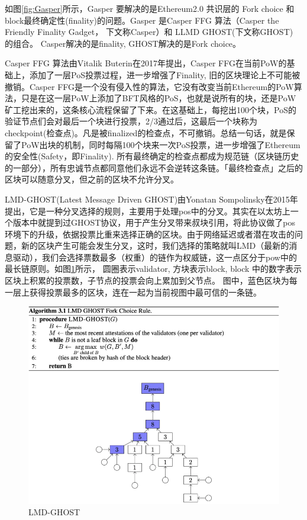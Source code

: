 \documentclass[a4paper,twoside]{scrbook}
\begin{document}
\begin{CJK}{UTF8}{gbsn}
如图\ref{fig:Gasper}所示，Gasper 要解决的是Ethereum2.0 共识层的 Fork choice 和 block最终确定性(finality)的问题。Gasper 是Casper FFG 算法（Casper the Friendly Finality Gadget， 下文称Casper）和 LLMD GHOST(下文称GHOST) 的组合。 Casper解决的是finality, GHOST解决的是Fork choice。

Casper FFG 算法由Vitalik Buterin\cite{buterin2017casper}在2017年提出，Casper FFG在当前PoW的基础上，添加了一层PoS投票过程，进一步增强了Finality, 旧的区块理论上不可能被撤销。Casper FFG是一个没有侵入性的算法，它没有改变当前Ethereum的PoW算法，只是在这一层PoW上添加了BFT风格的PoS，也就是说所有的块，还是PoW矿工挖出来的，这条核心流程保留了下来。在这基础上，每挖出100个块，PoS的验证节点们会对最后一个块进行投票，2/3通过后，这最后一个块称为checkpoint(检查点)。凡是被finalized的检查点，不可撤销。总结一句话，就是保留了PoW出块的机制，同时每隔100个块来一次PoS投票，进一步增强了Ethereum的安全性(Safety，即Finality). 所有最终确定的检查点都成为规范链（区块链历史的一部分），所有忠诚节点都同意他们永远不会逆转这条链。「最终检查点」之后的区块可以随意分叉，但之前的区块不允许分叉。

LMD-GHOST(Latest Message Driven GHOST)由Yonatan Sompolinsky\cite{sompolinsky2015secure}在2015年提出，它是一种分叉选择的规则，主要用于处理pos中的分叉。其实在以太坊上一个版本中就提到过GHOST协议，用于产生分叉带来叔块引用，将此协议做了pos环境下的升级，依据投票比重来选择正确的区块。由于网络延迟或者潜在攻击的问题，新的区块产生可能会发生分叉，这时，我们选择的策略就叫LMD（最新的消息驱动），我们会选择票数最多（权重）的链作为权威链，这一点区分于pow中的最长链原则。如图\ref{fig:GHOST}所示， 圆圈表示validator, 方块表示block, block 中的数字表示区块上积累的投票数，子节点的投票会向上累加到父节点。 图中，蓝色区块为每一层上获得投票最多的区块，连在一起为当前视图中最可信的一条链。

\begin{figure}[!htbp]
\centering
\includegraphics[width=1\textwidth]{Figures/GHOST.png}
\caption{LMD-GHOST} 
\label{fig:GHOST}
\end{figure}


\end{CJK}
\end{document}
